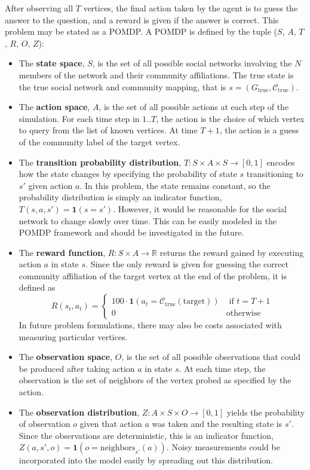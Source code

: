 \documentclass{IEEEtran}
\newcommand{\Gt}{\ensuremath{G_\text{true}}}
\newcommand{\Comt}{\ensuremath{\mathcal{C}_\text{true}}}
\newcommand{\target}{\ensuremath{\text{target}}}
\begin{document}
After observing all $T$ vertices, the final action taken by the agent is to guess the answer to the question, and a reward is given if the answer is correct. This problem may be stated as a POMDP. A POMDP is defined by the tuple ($S$, $A$, $T$, $R$, $O$, $Z$):

\begin{itemize}
    \item The \textbf{state space}, $S$, is the set of all possible social networks involving the $N$ members of the network and their community affiliations. The true state is the true social network and community mapping, that is $s = (\Gt, \Comt)$.
    \item The \textbf{action space}, $A$, is the set of all possible actions at each step of the simulation. For each time step in $1..T$, the action is the choice of which vertex to query from the list of known vertices. At time $T+1$, the action is a guess of the community label of the target vertex.
    \item The \textbf{transition probability distribution}, $T:S \times A \times S \to [0,1]$ encodes how the state changes by specifying the probability of state $s$ transitioning to $s'$ given action $a$. In this problem, the state remains constant, so the probability distribution is simply an indicator function, $T(s, a, s') = \mathbf{1}(s = s')$. However, it would be reasonable for the social network to change slowly over time. This can be easily modeled in the POMDP framework and should be investigated in the future.
    \item The \textbf{reward function}, $R: S \times A \to \mathbb{R}$ returns the reward gained by executing action $a$ in state $s$. Since the only reward is given for guessing the correct community affiliation of the target vertex at the end of the problem, it is defined as
        \begin{equation}
            R(s_t, a_t) = 
            \begin{cases}
                100\cdot \mathbf{1}(a_t = \Comt(\target)) & \text{ if } t = T+1 \\
                0 & \text{otherwise}
            \end{cases}
        \end{equation}
        In future problem formulations, there may also be costs associated with measuring particular vertices.
    \item The \textbf{observation space}, $O$, is the set of all possible observations that could be produced after taking action $a$ in state $s$. At each time step, the observation is the set of neighbors of the vertex probed as specified by the action.
    \item The \textbf{observation distribution}, $Z:A \times S \times O \to [0,1]$ yields the probability of observation $o$ given that action $a$ was taken and the resulting state is $s'$. Since the observations are deterministic, this is an indicator function, $Z(a, s', o) = \mathbf{1}(o = \text{neighbors}_{s'}(a))$. Noisy measurements could be incorporated into the model easily by spreading out this distribution.
\end{itemize}
\end{document}
